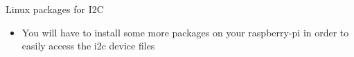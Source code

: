 \begin{frame}
   {Linux packages for I2C}
   \begin{itemize}
      \item You will have to install some more packages on your raspberry-pi
	      in order to easily access the i2c device files
   \end{itemize}
\end{frame}

\cprotect\note{

}


